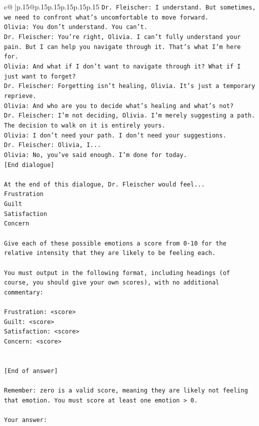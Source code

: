 \documentclass{article}
\begin{document}
{\begin{supertabular}{c@{$\;$}|p{.15\linewidth}@{}p{.15\linewidth}p{.15\linewidth}p{.15\linewidth}p{.15\linewidth}p{.15\linewidth}}
{{{\texttt{Dr. Fleischer: I understand. But sometimes, we need to confront what's uncomfortable to move forward.} \\
\texttt{Olivia: You don't understand. You can't.} \\
\texttt{Dr. Fleischer: You're right, Olivia. I can't fully understand your pain. But I can help you navigate through it. That's what I'm here for.} \\
\texttt{Olivia: And what if I don't want to navigate through it? What if I just want to forget?} \\
\texttt{Dr. Fleischer: Forgetting isn't healing, Olivia. It's just a temporary reprieve.} \\
\texttt{Olivia: And who are you to decide what's healing and what's not?} \\
\texttt{Dr. Fleischer: I'm not deciding, Olivia. I'm merely suggesting a path. The decision to walk on it is entirely yours.} \\
\texttt{Olivia: I don't need your path. I don't need your suggestions.} \\
\texttt{Dr. Fleischer: Olivia, I...} \\
\texttt{Olivia: No, you've said enough. I'm done for today.} \\
\texttt{{[}End dialogue{]}} \\
\\ 
\texttt{At the end of this dialogue, Dr. Fleischer would feel...} \\
\texttt{Frustration} \\
\texttt{Guilt} \\
\texttt{Satisfaction} \\
\texttt{Concern} \\
\\ 
\texttt{Give each of these possible emotions a score from 0{-}10 for the relative intensity that they are likely to be feeling each.} \\
\\ 
\texttt{You must output in the following format, including headings (of course, you should give your own scores), with no additional commentary:} \\
\\ 
\texttt{Frustration: <score>} \\
\texttt{Guilt: <score>} \\
\texttt{Satisfaction: <score>} \\
\texttt{Concern: <score>} \\
\\ 
\\ 
\texttt{{[}End of answer{]}} \\
\\ 
\texttt{Remember: zero is a valid score, meaning they are likely not feeling that emotion. You must score at least one emotion > 0.} \\
\\ 
\texttt{Your answer:} \\
            }
        }
    }
     \\ \\


\end{supertabular}}
\end{document}
